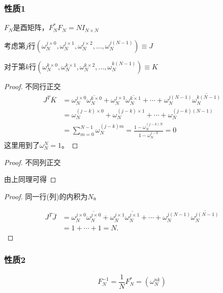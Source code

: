 \documentclass[12pt,a4paper]{article}
\numberwithin{subsection}{section}   %
\numberwithin{subsubsection}{subsection}
\theoremstyle{plain}
\theoremstyle{definition}
\theoremstyle{remark}
\theoremstyle{remark}
\begin{document}
\subsubsection{性质1}
		 $F_N$是酉矩阵，$F_N^* F_N = N I_{N \times N}$
		

考虑第$j$行$(\omega_N^{j \times 0}, \omega_N^{j \times 1}, \omega_N^{j \times 2}, \ldots, \omega_N^{j(N-1)}) \equiv J$
			
			对于第$k$行$(\omega_N^{k \times 0}, \omega_N^{k \times 1}, \omega_N^{k \times 2}, \ldots, \omega_N^{k(N-1)}) \equiv K$
			
			
			\begin{proof}不同行正交
	\begin{equation}
		\begin{aligned}
			J^T \overline{K} &= \omega_N^{j \times 0} \overline{\omega_N^{k \times 0}} + \omega_N^{j \times 1} \overline{\omega_N^{k \times 1}} + \cdots + \omega_N^{j(N-1)} \overline{\omega_N^{k(N-1)}} \\[8pt]
			&= \omega_N^{(j - k) \times 0} + \omega_N^{(j - k) \times 1} + \cdots + \omega_N^{(j - k)(N-1)} \\[8pt]
			&= \sum_{m=0}^{N-1} \omega_N^{(j - k)m} = \frac{1 - \omega_N^{(j - k)N}}{1 - \omega_N^{j - k}} = 0
		\end{aligned}
	\end{equation}
			这里用到了$\omega_N^N = 1$。
			\end{proof}
			
				\begin{proof}不同列正交
	           
	           由上同理可得
				\end{proof}
			
	 \begin{proof}同一行(列)的内积为$N$。
			
			\begin{equation}
				\begin{aligned}
					J^T \overline{J} &= \omega_N^{j \times 0} \overline{\omega_N^{j \times 0}} + \omega_N^{j \times 1} \overline{\omega_N^{j \times 1}} + \cdots + \omega_N^{j(N-1)} \overline{\omega_N^{j(N-1)}} \\[8pt]
					&= 1 + \cdots + 1 = N.
				\end{aligned}
			\end{equation}
		\end{proof}
	
		\subsubsection{性质2}
	\begin{equation}
		F_N^{-1} = \frac{1}{N} F_N^* = \left( \omega_N^{nk} \right)
	\end{equation}
	
\end{document}
